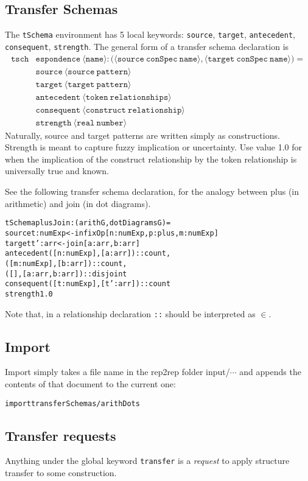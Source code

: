\documentclass[a4paper]{article}
\theoremstyle{definition}
\begin{document}
	\subsection{Transfer Schemas}
	The \texttt{tSchema} environment has 5 local keywords: \texttt{source}, \texttt{target}, \texttt{antecedent}, \texttt{consequent}, \texttt{strength}. The general form of a transfer schema declaration is \begin{align*}
	\mathtt{tsch}& \mathtt{espondence}\ \mathtt{\langle name\rangle : \big(\langle source\ conSpec\ name\rangle,\langle target\ conSpec\ name\rangle\big)} =\\[-3pt]
	& \mathtt{source\ \langle source\ pattern \rangle}\\[-3pt]
	& \mathtt{target\  \langle target\ pattern \rangle}\\[-3pt]
	& \mathtt{antecedent\  \langle token\ relationships \rangle}\\[-3pt]
	& \mathtt{consequent\  \langle construct\ relationship \rangle}\\[-3pt]
	& \mathtt{strength\  \langle real\ number \rangle}
	\end{align*}
	Naturally, source and target patterns are written simply as constructions. Strength is meant to capture fuzzy implication or uncertainty. Use value 1.0 for when the implication of the construct relationship by the token relationship is universally true and known.

	See the following transfer schema declaration, for the analogy between plus (in arithmetic) and join (in dot diagrams).
\begin{alltt}
tSchema plusJoin:(arithG,dotDiagramsG) =
    source t:numExp <- infixOp[n:numExp,p:plus,m:numExp]
    target t':arr <- join[a:arr,b:arr]
    antecedent ([n:numExp],[a:arr]) :: count,
              ([m:numExp],[b:arr]) :: count,
              ([],[a:arr,b:arr]) :: disjoint
    consequent ([t:numExp],[t':arr]) :: count
    strength 1.0
\end{alltt}
 Note that, in a relationship declaration \texttt{::} should be interpreted as $\in$.
	\subsection{Import}
	Import simply takes a file name in the rep2rep folder input/$\cdots$ and appends the contents of that document to the current one:
\begin{alltt}
import transferSchemas/arithDots
\end{alltt}
	\subsection{Transfer requests}
	Anything under the global keyword \texttt{transfer} is a \textit{request} to apply structure transfer to some construction.
\end{document}
